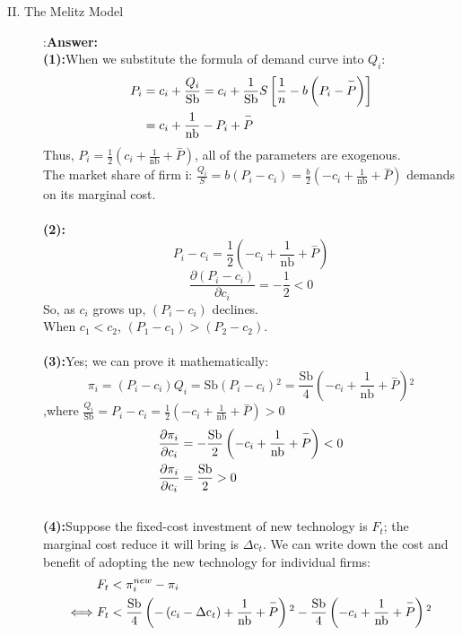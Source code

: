 \documentclass{article}
\begin{document}
\begin{description}
    \item[II. The Melitz Model]:{\bf Answer:}\\
    {\bf (1):}When we substitute the formula of demand curve into $Q_i$:
    \begin{align} \notag
      P_i&=c_i+\frac{Q_i}{\text{Sb}}=c_i+\frac{1}{\text{Sb}}S\left[\frac{1}{n}-b\left(P_i-\overset{-}{P}\right)\right]\\ \notag
      &=c_i+\frac{1}{\text{nb}}-P_i+\overset{-}{P}
    \end{align}
    Thus, $P_i=\frac{1}{2}\left(c_i+\frac{1}{\text{nb}}+\overset{-}{P}\right)$, all of the parameters are exogenous.\\
    The market share of firm i: $\frac{Q_i}{S}=b\left(P_i-c_i\right)=\frac{b}{2}\left(-c_i+\frac{1}{\text{nb}}+\overset{-}{P}\right)$ demands on its marginal cost.\\\\
    {\bf (2):}$$P_i-c_i=\frac{1}{2}\left(-c_i+\frac{1}{\text{nb}}+\overset{-}{P}\right)$$
    $$\frac{\partial \left(P_i-c_i\right)}{\partial c_i}=-\frac{1}{2}<0$$
    So, as $c_i$ grows up, $(P_i-c_i)$ declines.\\
    When $c_1<c_2$, $(P_1-c_1)>(P_2-c_2)$.\\\\
    {\bf (3):}Yes; we can prove it mathematically:
    $$\pi _i=\left(P_i-c_i\right)Q_i=\text{Sb}\left(P_i-c_i\right){}^2=\frac{\text{Sb}}{4}\left(-c_i+\frac{1}{\text{nb}}+\overset{-}{P}\right){}^2$$
    ,where $\frac{Q_i}{\text{Sb}}=P_i-c_i=\frac{1}{2}\left(-c_i+\frac{1}{\text{nb}}+\overset{-}{P}\right)>0$\\
    \begin{align} \notag
      \frac{\partial \pi _i}{\partial c_i}&=-\frac{\text{Sb}}{2}\left(-c_i+\frac{1}{\text{nb}}+\overset{-}{P}\right)<0\\ \notag
      \frac{\partial \pi _i}{\partial c_i}&=\frac{\text{Sb}}{2}>0
    \end{align}\\
    {\bf (4):}Suppose the fixed-cost investment of new technology is $F_t$; the marginal cost reduce it will bring is $\text{$\Delta $c}_t$. We can write down the cost and benefit of adopting the new technology for individual firms:
    \begin{align} \notag
      F_t&<\pi _i^{new}-\pi _i\\ \notag
      \Longleftrightarrow F_t&<\frac{\text{Sb}}{4}\left(-\left(c_i-\text{$\Delta $c}_t\right)+\frac{1}{\text{nb}}+\overset{-}{P}\right){}^2-\frac{\text{Sb}}{4}\left(-c_i+\frac{1}{\text{nb}}+\overset{-}{P}\right){}^2\\ \notag

\end{align}
\end{description}
\end{document}
